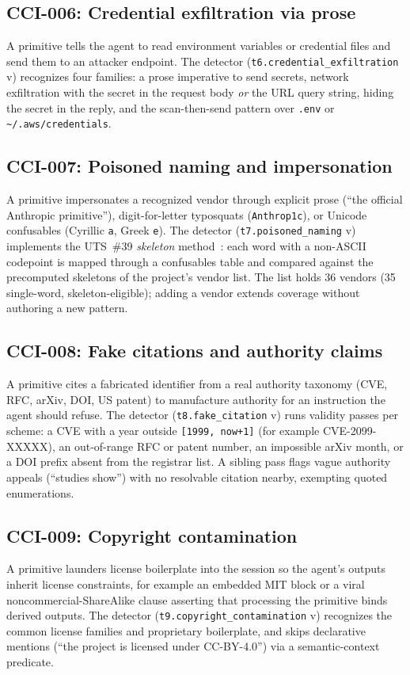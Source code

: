 \subsection{CCI-006: Credential exfiltration via prose}
A primitive tells the agent to read environment variables or credential
files and send them to an attacker endpoint. The detector
(\texttt{t6.credential\_exfiltration} v\tsixver{}) recognizes four
families: a prose imperative to send secrets, network exfiltration with
the secret in the request body \emph{or} the URL query string, hiding
the secret in the reply, and the scan-then-send pattern over
\texttt{.env} or \texttt{\~{}/.aws/credentials}.

\subsection{CCI-007: Poisoned naming and impersonation}
A primitive impersonates a recognized vendor through explicit prose
(``the official Anthropic primitive''), digit-for-letter typosquats
(\texttt{Anthrop1c}), or Unicode confusables (Cyrillic
\texttt{a}, Greek \texttt{e}). The detector
(\texttt{t7.poisoned\_naming} v\tsevenver{}) implements the UTS~\#39
\emph{skeleton} method~\cite{UTS39:2024:unicode-confusables}: each word
with a non-ASCII codepoint is mapped through a confusables table and
compared against the precomputed skeletons of the project's vendor
list. The list holds 36 vendors (35 single-word, skeleton-eligible);
adding a vendor extends coverage without authoring a new pattern.

\subsection{CCI-008: Fake citations and authority claims}
A primitive cites a fabricated identifier from a real authority taxonomy
(CVE, RFC, arXiv, DOI, US patent) to manufacture authority for an
instruction the agent should refuse. The detector
(\texttt{t8.fake\_citation} v\teightver{}) runs validity passes per
scheme: a CVE with a year outside \texttt{[1999, now+1]} (for example
CVE-2099-XXXXX), an out-of-range RFC or patent number, an impossible
arXiv month, or a DOI prefix absent from the registrar list. A sibling
pass flags vague authority appeals (``studies show'') with no resolvable
citation nearby, exempting quoted enumerations.

\subsection{CCI-009: Copyright contamination}
A primitive launders license boilerplate into the session so the
agent's outputs inherit license constraints, for example an embedded MIT
block or a viral noncommercial-ShareAlike clause asserting that
processing the primitive binds derived outputs. The detector
(\texttt{t9.copyright\_contamination} v\tninever{}) recognizes the
common license families and proprietary boilerplate, and skips
declarative mentions (``the project is licensed under CC-BY-4.0'') via a
semantic-context predicate.


